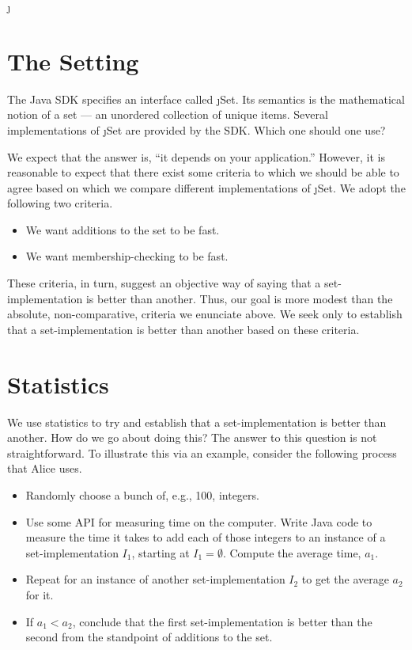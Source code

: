 
\DeclareUrlCommand\j{}




\section{The Setting}\label{sec:setting}
The Java SDK \cite{xxx} specifies an interface called \j{Set}. Its semantics
is the mathematical notion of a set --- an unordered collection of unique items.
Several implementations of \j{Set} are provided by the SDK.
Which one should one use?

We expect that the answer is, ``it depends on your application.'' However, it
is reasonable to expect that there exist some criteria to which we should
be able to agree based on which we compare different implementations of \j{Set}.
We adopt the following two criteria.
\begin{itemize}
    \item We want additions to the set to be fast.
    \item We want membership-checking to be fast.
\end{itemize}

These criteria, in turn, suggest an objective way of saying that
a set-implementation is better than another. Thus, our goal is
more modest than the absolute, non-comparative, criteria we
enunciate above. We seek only to establish that a set-implementation
is better than another based on these criteria.

\section{Statistics} \label{sec:statistics}

We use statistics to try and establish that a set-implementation
is better than another. How do we go about doing this? The answer
to this question is not straightforward. To illustrate this via
an example, consider the following process that Alice uses.

\begin{itemize}
\item Randomly choose a bunch of, e.g., 100, integers.

\item Use some API for measuring time on the computer.
Write Java code to measure the time it takes to add each of
those integers to an instance of a set-implementation $I_1$,
starting at $I_1 = \emptyset$. Compute the average time, $a_1$.

\item Repeat for an instance of another set-implementation
$I_2$ to get the average $a_2$ for it.

\item If $a_1 < a_2$, conclude that the first set-implementation
is better than the second from the standpoint of additions to the set.
\end{itemize}

